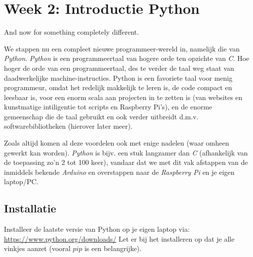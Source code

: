 \chapter{Week 2: Introductie Python}
\begin{fquote}
	And now for something completely different.
\end{fquote}

We stappen nu een compleet nieuwe programmeer-wereld in, namelijk die van \textit{Python}. \textit{Python} is een programmeertaal van hogere orde ten opzichte van \textit{C}. Hoe hoger de orde van een programmeertaal, des te verder de taal weg staat van daadwerkelijke machine-instructies. \newline
Python is een favoriete taal voor menig programmeur, omdat het redelijk makkelijk te leren is, de code compact en leesbaar is, voor een enorm scala aan projecten in te zetten is (van websites en kunstmatige intiligentie tot scripts en Raspberry Pi's), en de enorme gemeenschap die de taal gebruikt en ook verder uitbreidt d.m.v. softwarebibliotheken (hierover later meer). \newline

Zoals altijd komen al deze voordelen ook met enige nadelen (waar omheen gewerkt kan worden). \textit{Python} is bijv. een stuk langzamer dan \textit{C} (afhankelijk van de toepassing zo'n 2 tot 100 keer), vandaar dat we met dit vak afstappen van de inmiddels bekende \textit{Arduino} en overstappen naar de \textit{Raspberry Pi} en je eigen laptop/PC.

\section{Installatie}
\begin{exercise}
Installeer de laatste versie van Python op je eigen laptop via: \newline
\url{https://www.python.org/downloads/} \newline
Let er bij het installeren op dat je alle vinkjes aanzet (vooral $pip$ is een belangrijke).
\end{exercise}

